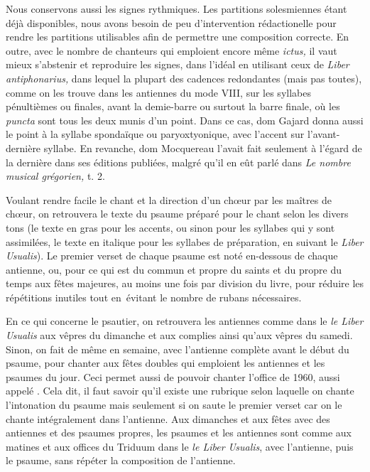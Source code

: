 \begin{frpars}
Nous conservons aussi les signes rythmiques. Les partitions solesmiennes étant déjà disponibles, nous avons besoin de peu d'intervention rédactionelle pour rendre les partitions utilisables afin de permettre une composition correcte. En outre, avec le nombre de chanteurs qui emploient encore même \textit{ictus,} il vaut mieux s'abstenir et reproduire les signes, dans l'idéal en utilisant ceux de \textit{Liber antiphonarius,} dans lequel la plupart des cadences redondantes (mais pas toutes), comme on les trouve dans les antiennes du mode VIII, sur les syllabes pénultièmes ou finales, avant la demie-barre ou surtout la barre finale, où les \textit{puncta} sont tous les deux munis d'un point. Dans ce cas, dom Gajard donna aussi le point à la syllabe spondaïque ou paryoxtyonique, avec l'accent sur l'avant-dernière syllabe. En revanche, dom Mocquereau l'avait fait seulement à l'égard de la dernière dans ses éditions publiées, malgré qu'il en eût parlé dans \textit{Le nombre musical grégorien,} t. 2.

Voulant rendre facile le chant et la direction d'un chœur par les maîtres de chœur, on retrouvera le texte du psaume préparé pour le chant selon les divers tons (le texte en gras pour les accents, ou sinon pour les syllabes qui y sont assimilées, le texte en italique pour les syllabes de préparation, en suivant le \textit{Liber Usualis}). Le premier verset de chaque psaume est noté en-dessous de chaque antienne, ou, pour ce qui est du commun et propre du saints et du propre du temps aux fêtes majeures, au moins une fois par division du livre, pour réduire les répétitions inutiles tout en évitant le nombre de rubans nécessaires.

En ce qui concerne le psautier, on retrouvera les antiennes comme dans le \textit{le Liber Usualis} aux vêpres du dimanche et aux complies ainsi qu'aux vêpres du samedi. Sinon, on fait de même en semaine, avec l'antienne complète avant le début du psaume, pour chanter aux fêtes doubles qui emploient les antiennes et les psaumes du jour. Ceci permet aussi de pouvoir chanter l'office de 1960, aussi appelé . Cela dit, il faut savoir qu'il existe une rubrique selon laquelle on chante l'intonation du psaume mais seulement si on saute le premier verset car on le chante intégralement dans l'antienne. Aux dimanches et aux fêtes avec des antiennes et des psaumes propres, les psaumes et les antiennes sont comme aux matines et aux offices du Triduum dans le \textit{le Liber Usualis}, avec l'antienne, puis le psaume, sans répéter la composition de l'antienne.


\end{frpars}
